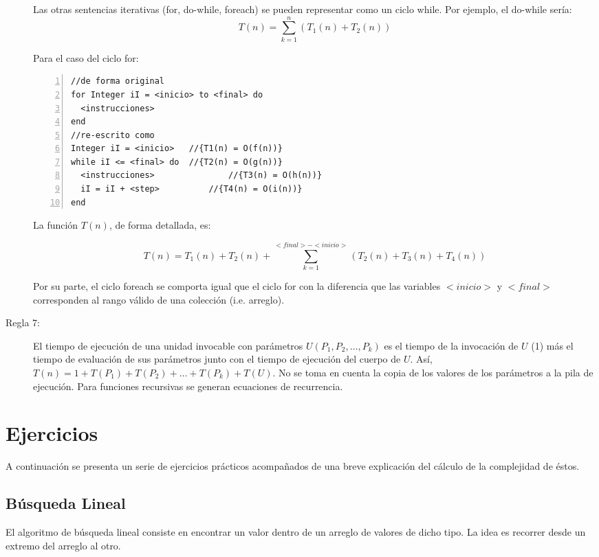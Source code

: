 \begin{description}
Las otras sentencias iterativas (for, do-while, foreach) se pueden representar como un ciclo while. Por ejemplo, el do-while sería:
$$T(n) = \sum_{k=1}^{n}{(T_1(n) + T_2(n))}$$

Para el caso del ciclo for:
\begin{lstlisting}[upquote=true, language=pseudo, numbers=left]
//de forma original
for Integer iI = <inicio> to <final> do
  <instrucciones>
end
//re-escrito como
Integer iI = <inicio>	//{T1(n) = O(f(n))}
while iI <= <final> do	//{T2(n) = O(g(n))}
  <instrucciones>				//{T3(n) = O(h(n))}
  iI = iI + <step>			//{T4(n) = O(i(n))}
end
\end{lstlisting}

La función $T(n)$, de forma detallada, es:

$$T(n) = T_1(n) + T_2(n) + \sum_{k=1}^{<final> - <inicio>}{(T_2(n) + T_3(n) + T_4(n))}$$

Por su parte, el ciclo foreach se comporta igual que el ciclo for con la diferencia que las variables $<inicio>$ y $<final>$ corresponden al rango válido de una colección (i.e. arreglo).

\item[Regla 7:] El tiempo de ejecución de una unidad invocable con parámetros $U(P_1, P_2, \dots, P_k)$ es el tiempo de la invocación de $U$ (1) más el tiempo de evaluación de sus parámetros junto con el tiempo de ejecución del cuerpo de $U$. Así, $T(n) = 1 + T(P_1) + T(P_2) + \dots + T(P_k) + T(U)$. No se toma en cuenta la copia de los valores de los parámetros a la pila de ejecución. Para funciones recursivas se generan ecuaciones de recurrencia.
\end{description}

\section{Ejercicios}

A continuación se presenta un serie de ejercicios prácticos acompañados de una breve explicación del cálculo de la complejidad de éstos.

\subsection{Búsqueda Lineal}

El algoritmo de búsqueda lineal consiste en encontrar un valor dentro de un arreglo de valores de dicho tipo. La idea es recorrer desde un extremo del arreglo al otro.

